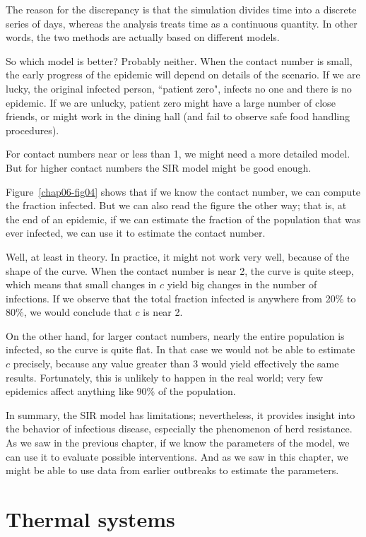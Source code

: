 \documentclass[12pt]{book}
\theoremstyle{exercise}
\begin{document}
The reason for the discrepancy is that the simulation divides time into a discrete series of days, whereas the analysis treats time as a continuous quantity.  In other words, the two methods are actually based on different models.

So which model is better?  Probably neither.  When the contact number is small, the early progress of the epidemic will depend on details of the scenario.  If we are lucky, the original infected person, ``patient zero",  infects no one and there is no epidemic.  If we are unlucky, patient zero might have a large number of close friends, or might work in the dining hall (and fail to observe safe food handling procedures).

For contact numbers near or less than 1, we might need a more detailed model.  But for higher contact numbers the SIR model might be good enough.

Figure~\ref{chap06-fig04} shows that if we know the contact number, we can compute the fraction infected.  But we can also read the figure the other way; that is, at the end of an epidemic, if we can estimate the fraction of the population that was ever infected, we can use it to estimate the contact number.

Well, at least in theory.  In practice, it might not work very well, because of the shape of the curve.  When the contact number is near 2, the curve is quite steep, which means that small changes in $c$ yield big changes in the number of infections.  If we observe that the total fraction infected is anywhere from 20\% to 80\%, we would conclude that $c$ is near 2.

On the other hand, for larger contact numbers, nearly the entire population is infected, so the curve is quite flat.  In that case we would not be able to estimate $c$ precisely, because any value greater than 3 would yield effectively the same results.  Fortunately, this is unlikely to happen in the real world; very few epidemics affect anything like 90\% of the population.

In summary, the SIR model has limitations; nevertheless, it provides insight into the behavior of infectious disease, especially the phenomenon of herd resistance.  As we saw in the previous chapter, if we know the parameters of the model, we can use it to evaluate possible interventions.  And as we saw in this chapter, we might be able to use data from earlier outbreaks to estimate the parameters.



\chapter{Thermal systems}
\end{document}
